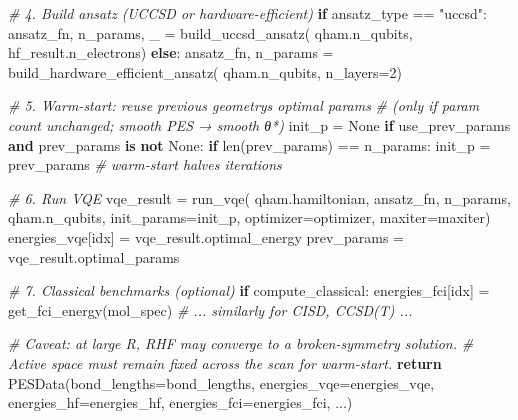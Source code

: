 \documentclass[
  11pt,
]{report}
\newenvironment{Shaded}{}{}
\newcommand{\BuiltInTok}[1]{\textcolor[rgb]{0.00,0.50,0.00}{#1}}
\newcommand{\CommentTok}[1]{\textcolor[rgb]{0.38,0.63,0.69}{\textit{#1}}}
\newcommand{\ControlFlowTok}[1]{\textcolor[rgb]{0.00,0.44,0.13}{\textbf{#1}}}
\newcommand{\DecValTok}[1]{\textcolor[rgb]{0.25,0.63,0.44}{#1}}
\newcommand{\KeywordTok}[1]{\textcolor[rgb]{0.00,0.44,0.13}{\textbf{#1}}}
\newcommand{\NormalTok}[1]{#1}
\newcommand{\OperatorTok}[1]{\textcolor[rgb]{0.40,0.40,0.40}{#1}}
\newcommand{\StringTok}[1]{\textcolor[rgb]{0.25,0.44,0.63}{#1}}
\newcommand{\VariableTok}[1]{\textcolor[rgb]{0.10,0.09,0.49}{#1}}
\begin{document}
\begin{Shaded}
\begin{Highlighting}[]
        \CommentTok{\# 4. Build ansatz (UCCSD or hardware{-}efficient)}
        \ControlFlowTok{if}\NormalTok{ ansatz\_type }\OperatorTok{==} \StringTok{"uccsd"}\NormalTok{:}
\NormalTok{            ansatz\_fn, n\_params, \_ }\OperatorTok{=}\NormalTok{ build\_uccsd\_ansatz(}
\NormalTok{                qham.n\_qubits, hf\_result.n\_electrons)}
        \ControlFlowTok{else}\NormalTok{:}
\NormalTok{            ansatz\_fn, n\_params }\OperatorTok{=}\NormalTok{ build\_hardware\_efficient\_ansatz(}
\NormalTok{                qham.n\_qubits, n\_layers}\OperatorTok{=}\DecValTok{2}\NormalTok{)}

        \CommentTok{\# 5. Warm{-}start: reuse previous geometry\textquotesingle{}s optimal params}
        \CommentTok{\#    (only if param count unchanged; smooth PES → smooth θ*)}
\NormalTok{        init\_p }\OperatorTok{=} \VariableTok{None}
        \ControlFlowTok{if}\NormalTok{ use\_prev\_params }\KeywordTok{and}\NormalTok{ prev\_params }\KeywordTok{is} \KeywordTok{not} \VariableTok{None}\NormalTok{:}
            \ControlFlowTok{if} \BuiltInTok{len}\NormalTok{(prev\_params) }\OperatorTok{==}\NormalTok{ n\_params:}
\NormalTok{                init\_p }\OperatorTok{=}\NormalTok{ prev\_params  }\CommentTok{\# warm{-}start halves iterations}

        \CommentTok{\# 6. Run VQE}
\NormalTok{        vqe\_result }\OperatorTok{=}\NormalTok{ run\_vqe(}
\NormalTok{            qham.hamiltonian, ansatz\_fn, n\_params, qham.n\_qubits,}
\NormalTok{            init\_params}\OperatorTok{=}\NormalTok{init\_p, optimizer}\OperatorTok{=}\NormalTok{optimizer, maxiter}\OperatorTok{=}\NormalTok{maxiter)}
\NormalTok{        energies\_vqe[idx] }\OperatorTok{=}\NormalTok{ vqe\_result.optimal\_energy}
\NormalTok{        prev\_params }\OperatorTok{=}\NormalTok{ vqe\_result.optimal\_params}

        \CommentTok{\# 7. Classical benchmarks (optional)}
        \ControlFlowTok{if}\NormalTok{ compute\_classical:}
\NormalTok{            energies\_fci[idx] }\OperatorTok{=}\NormalTok{ get\_fci\_energy(mol\_spec)}
            \CommentTok{\# ... similarly for CISD, CCSD(T) ...}

    \CommentTok{\# Caveat: at large R, RHF may converge to a broken{-}symmetry solution.}
    \CommentTok{\# Active space must remain fixed across the scan for warm{-}start.}
    \ControlFlowTok{return}\NormalTok{ PESData(bond\_lengths}\OperatorTok{=}\NormalTok{bond\_lengths, energies\_vqe}\OperatorTok{=}\NormalTok{energies\_vqe,}
\NormalTok{                   energies\_hf}\OperatorTok{=}\NormalTok{energies\_hf, energies\_fci}\OperatorTok{=}\NormalTok{energies\_fci, ...)}
\end{Highlighting}
\end{Shaded}
\end{document}
